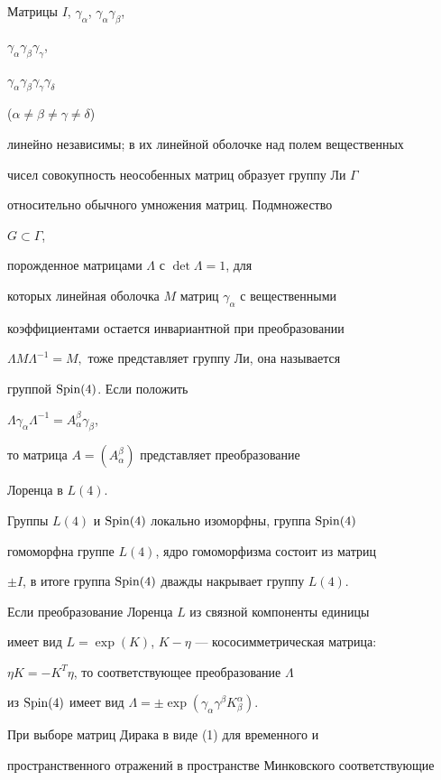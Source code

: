 




Матрицы $I$, $\gamma_\alpha$, $\gamma_\alpha\gamma_\beta$,


$\gamma_\alpha\gamma_\beta\gamma_\gamma$,


$\gamma_\alpha\gamma_\beta\gamma_\gamma\gamma_\delta$


($\alpha \ne\beta \ne\gamma\ne\delta$)


линейно независимы; в их линейной оболочке над полем вещественных


чисел совокупность неособенных матриц образует группу Ли $\Gamma$


относительно обычного умножения матриц. Подмножество


$G\subset\Gamma$,


порожденное матрицами $\Lambda$ с $\det\Lambda=1$, для


которых линейная оболочка $M$ матриц $\gamma_\alpha$ с вещественными


коэффициентами остается инвариантной при преобразовании


$\Lambda{M}\Lambda^{-1}=M,$ тоже представляет группу Ли, она называется


группой $\operatorname{Spin}(4)$. Если положить


$\Lambda\gamma_\alpha\Lambda^{-1}=A^{\beta}_{\alpha}\gamma_{\beta}$,


то матрица $A=(A^{\beta}_{\alpha})$ представляет преобразование


Лоренца в $L(4)$.


Группы $ L(4)$ и $\operatorname{Spin}(4)$ локально изоморфны, группа $\operatorname{Spin}(4)$


гомоморфна группе $L(4)$, ядро гомоморфизма состоит из матриц


$\pm{I}$, в итоге группа $\operatorname{Spin}(4)$ дважды накрывает группу $L(4)$.


Если преобразование Лоренца $L$ из связной компоненты единицы


имеет вид $L=\exp(K)$, $K-\eta$ --- кососимметрическая матрица:


$\eta K=-K^{T}\eta$, то соответствующее преобразование $\Lambda$


из $\Spin(4)$ имеет вид $\Lambda=\pm\exp(\gamma_{\alpha}


\gamma^{\beta}K^{\alpha}_{\beta})$.


При выборе матриц Дирака в виде (1) для временного и


пространственного отражений в пространстве Минковского соответствующие


